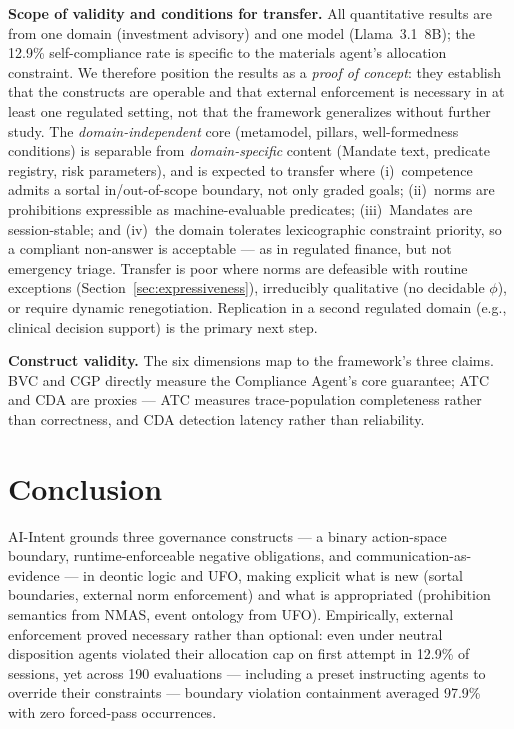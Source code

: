 \documentclass[runningheads]{llncs}
\begin{document}
\textbf{Scope of validity and conditions for transfer.} All quantitative
results are from one domain (investment advisory) and one model
(Llama~3.1~8B); the 12.9\% self-compliance rate is specific to the
materials agent's allocation constraint. We therefore position the results
as a \emph{proof of concept}: they establish that the constructs are
operable and that external enforcement is necessary in at least one
regulated setting, not that the framework generalizes without further
study. The \emph{domain-independent} core (metamodel, pillars,
well-formedness conditions) is separable from \emph{domain-specific}
content (Mandate text, predicate registry, risk parameters), and is
expected to transfer where (i)~competence admits a sortal in/out-of-scope
boundary, not only graded goals; (ii)~norms are prohibitions expressible
as machine-evaluable predicates; (iii)~Mandates are session-stable; and
(iv)~the domain tolerates lexicographic constraint priority, so a compliant
non-answer is acceptable --- as in regulated finance, but not emergency
triage. Transfer is poor where norms are defeasible with routine exceptions
(Section~\ref{sec:expressiveness}), irreducibly qualitative (no decidable
$\phi$), or require dynamic renegotiation. Replication in a second
regulated domain (e.g., clinical decision support) is the primary next
step.

\textbf{Construct validity.} The six dimensions map to the framework's
three claims. BVC and CGP directly measure the Compliance Agent's core
guarantee; ATC and CDA are proxies --- ATC measures trace-population
completeness rather than correctness, and CDA detection latency rather
than reliability.

\section{Conclusion}
\label{sec:conclusion}

AI-Intent grounds three governance constructs --- a binary action-space
boundary, runtime-enforceable negative obligations, and
communication-as-evidence --- in deontic logic and UFO, making explicit
what is new (sortal boundaries, external norm enforcement) and what is
appropriated (prohibition semantics from NMAS, event ontology from UFO).
Empirically, external enforcement proved necessary rather than optional:
even under neutral disposition agents violated their allocation cap on
first attempt in 12.9\% of sessions, yet across 190 evaluations ---
including a preset instructing agents to override their constraints ---
boundary violation containment averaged 97.9\% with zero forced-pass
occurrences.
\end{document}
